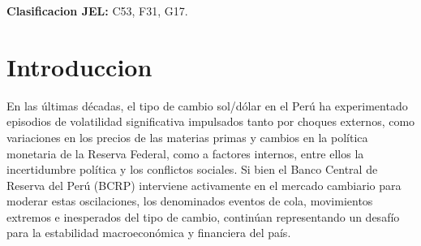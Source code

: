 ﻿\documentclass[11pt,a4paper]{article}
\newcommand{\todo}[1]{\textcolor{red}{[TODO: #1]}}
\begin{document}
\begin{abstract}
Este documento estudia los determinantes y la capacidad predictiva de la variabilidad extrema del tipo de cambio nominal sol/dólar estimando los percentiles extremos de su distribución condicional de retornos. Se propone un enfoque basado en Árboles de Regresión Aditivos Bayesianos (BART) como metodología principal de predicción, comparándolo con métodos de referencia como la caminata aleatoria, la regresión cuantílica lineal y el Quantile Random Forest. Como predictores se incorporan los factores identificados por la literatura internacional: riesgo sistémico global, condiciones financieras de Estados Unidos, política monetaria de la Reserva Federal, diferencial de tasas de interés, precios de materias primas, incertidumbre política e intervención cambiaria del BCRP. Se argumenta que BART es especialmente adecuado para este problema porque captura no linealidades e interacciones entre variables sin necesidad de especificarlas a priori, y porque provee medidas de incertidumbre bayesiana sobre las predicciones de cola, superando la principal limitación de la regresión cuantílica lineal predominante en la literatura existente. El estudio contribuye a llenar un vacío doble en la literatura: ningún trabajo previo analiza el riesgo de cola del tipo de cambio peruano de forma específica, ni aplica BART a una moneda emergente de América Latina.
\end{abstract}



\textbf{Clasificacion JEL:} C53, F31, G17.

\section{Introduccion}





En las últimas décadas, el tipo de cambio sol/dólar en el Perú ha experimentado episodios de volatilidad significativa impulsados tanto por choques externos, como variaciones en los precios de las materias primas y cambios en la política monetaria de la Reserva Federal, como a factores internos, entre ellos la incertidumbre política y los conflictos sociales. Si bien el Banco Central de Reserva del Perú (BCRP) interviene activamente en el mercado cambiario para moderar estas oscilaciones, los denominados eventos de cola, movimientos extremos e inesperados del tipo de cambio, continúan representando un desafío para la estabilidad macroeconómica y financiera del país.
\end{document}
